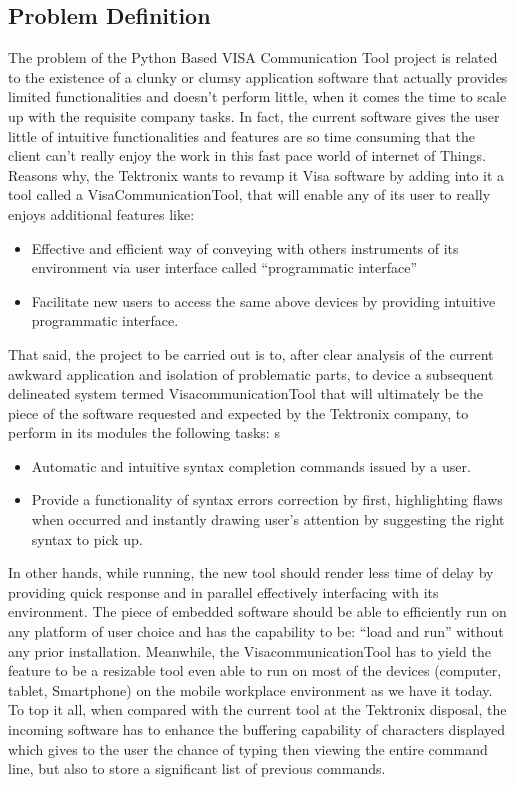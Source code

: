 \documentclass[letterpaper,10pt,notitlepage]{article}
\begin{document}
\subsection{Problem Definition}
The problem of the Python Based VISA Communication Tool project is related to the existence of a clunky or clumsy application software that actually provides limited functionalities and doesn’t perform little, when it comes the time to scale up with the requisite company tasks.
\newline
\newline
In fact, the current software gives the user little of intuitive functionalities and features are so time consuming that the client can’t really enjoy the work in this fast pace world of internet of Things. Reasons why, the Tektronix wants to revamp it Visa software by adding into it a tool called a VisaCommunicationTool, that will enable any of its user to really enjoys additional features like: 
    \begin{itemize}
        \item Effective and efficient way of conveying with others instruments of its environment via user interface called “programmatic interface”
        \item Facilitate new users to access the same above devices by providing intuitive programmatic interface.
    \end{itemize}
That said, the project to be carried out is to, after clear analysis of the current awkward application and isolation of problematic parts, to device a subsequent delineated system termed VisacommunicationTool that will ultimately be the piece of the software requested and expected by the Tektronix company, to perform in its modules the following tasks:
s   \begin{itemize}
        \item Automatic and intuitive syntax completion commands issued by a user.
        \item Provide a functionality of syntax errors correction by first, highlighting flaws when occurred and instantly drawing user’s attention by suggesting the right syntax to pick up.
    \end{itemize}
In other hands, while running, the new tool should render less time of delay by providing quick response and in parallel effectively interfacing with its environment.
The piece of embedded software should be able to efficiently run on any platform of user choice and has the capability to be: “load and run” without any prior installation. Meanwhile, the VisacommunicationTool has to yield the feature to be a resizable tool even able to run on most of the devices (computer, tablet, Smartphone) on the mobile workplace environment as we have it today. To top it all, when compared with the current tool at the Tektronix disposal, the incoming software has to enhance the buffering capability of characters displayed which gives to the user the chance of typing then viewing the entire command line, but also to store a significant list of previous commands.
\end{document}
